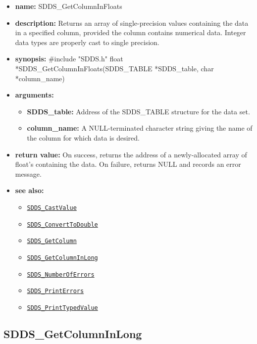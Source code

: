 \documentclass[11pt]{article}
\newcommand{\progref}[1]{\hyperref[SDDS_#1]{\tt SDDS\_#1}}
\begin{document}
\begin{itemize}
\item {\bf name:}\newline
SDDS\_GetColumnInFloats
\item {\bf description:}\newline
Returns an array of single-precision values containing the data in a specified column, provided the column contains numerical data. Integer data types are properly cast to single precision.
\item {\bf synopsis:} \#include "SDDS.h"\newline
float *SDDS\_GetColumnInFloats(SDDS\_TABLE *SDDS\_table, char *column\_name)
\item {\bf arguments:}
\begin{itemize}
\item {\bf SDDS\_table:} Address of the SDDS\_TABLE structure for the data set.
\item {\bf column\_name:} A NULL-terminated character string giving the name of the column for which data is desired.
\end{itemize}
\item {\bf return value:}\newline
On success, returns the address of a newly-allocated array of float's containing the data. On failure, returns NULL and records an error message.
\item {\bf see also:}
\begin{itemize}
\item \progref{CastValue}
\item \progref{ConvertToDouble}
\item \progref{GetColumn}
\item \progref{GetColumnInLong}
\item \progref{NumberOfErrors}
\item \progref{PrintErrors}
\item \progref{PrintTypedValue}
\end{itemize}
\end{itemize}

\subsection{SDDS\_GetColumnInLong}
\label{SDDS_GetColumnInLong}
\end{document}
